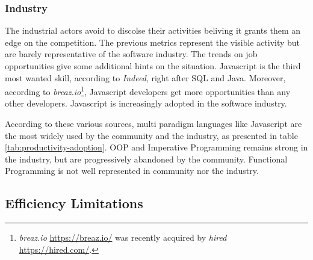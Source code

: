 \begin{figure}[h!]
\end{figure}

\subsubsection{Industry}

The industrial actors avoid to discolse their activities beliving it grants them an edge on the competition.
The previous metrics represent the visible activity but are barely representative of the software industry.
The trends on job opportunities give some additional hints on the situation.
Javascript is the third most wanted skill, according to \textit{Indeed}, right after SQL and Java.
Moreover, according to \textit{breaz.io}\footnote{\textit{breaz.io} \url{https://breaz.io/} was recently acquired by \textit{hired} \url{https://hired.com/}.}, Javascript developers get more opportunities than any other developers.
Javascript is increasingly adopted in the software industry.

\separator

According to these various sources, multi paradigm languages like Javascript are the most widely used by the community and the industry, as presented in table \ref{tab:productivity-adoption}.
OOP and Imperative Programming remains strong in the industry, but are progressively abandoned by the community.
Functional Programming is not well represented in community nor the industry.



\subsection{Efficiency Limitations} \label{chapter3:software-productivity:efficiency-limitations}

